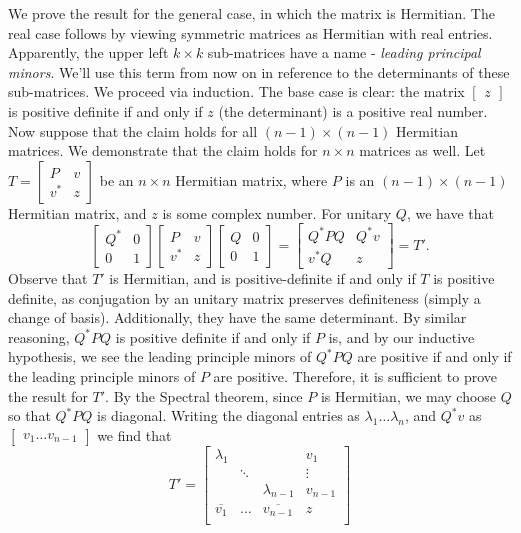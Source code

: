 \documentclass{scrartcl}
\begin{document}
\begin{solution}
        We prove the result for the general case, in which the matrix is Hermitian. The real case follows by viewing symmetric matrices as Hermitian with real entries. Apparently, the upper left $k\times k$ sub-matrices have a name - \textit{leading principal minors}. We'll use this term from now on in reference to the determinants of these sub-matrices. We proceed via induction. The base case is clear: the matrix $\begin{bmatrix} z \end{bmatrix}$ is positive definite if and only if $z$ (the determinant) is a positive real number. Now suppose that the claim holds for all $(n-1) \times (n-1)$ Hermitian matrices. We demonstrate that the claim holds for $n\times n$ matrices as well. Let $T=\begin{bmatrix} P & v \\ v^\ast & z \end{bmatrix}$ be an $n\times n$ Hermitian matrix, where $P$ is an $(n-1) \times (n-1)$ Hermitian matrix, and $z$ is some complex number. For unitary $Q$, we have that
        \[\begin{bmatrix} Q^\ast & 0 \\ 0 & 1 \end{bmatrix} \begin{bmatrix} P & v \\ v^\ast & z \end{bmatrix} \begin{bmatrix} Q & 0 \\ 0 & 1 \end{bmatrix}=\begin{bmatrix} {Q^\ast} P Q & Q^\ast v \\ v^\ast Q & z \end{bmatrix}=T'.\]
        Observe that $T'$ is Hermitian, and is positive-definite if and only if $T$ is positive definite, as conjugation by an unitary matrix preserves definiteness (simply a change of basis). Additionally, they have the same determinant. By similar reasoning, ${Q^\ast} P Q$ is positive definite if and only if $P$ is, and by our inductive hypothesis, we see the leading principle minors of ${Q^\ast} P Q$ are positive if and only if the leading principle minors of $P$ are positive. Therefore, it is sufficient to prove the result for $T'$. By the Spectral theorem, since $P$ is Hermitian, we may choose $Q$ so that $Q^\ast PQ$ is diagonal. Writing the diagonal entries as $\lambda_1 \dots \lambda_n$, and $Q^\ast v$ as $\begin{bmatrix} v_1 \dots v_{n-1} \end{bmatrix}$ we find that 
        \[T'=\begin{bmatrix} 
        \lambda_1 & & & v_1 \\
            & \ddots & & \vdots \\
            & & \lambda_{n-1} & v_{n-1} \\
        \overline{v_1} & \hdots & \overline{v_{n-1}} & z \\
        \end{bmatrix}\]
    

\end{solution}
\end{document}
